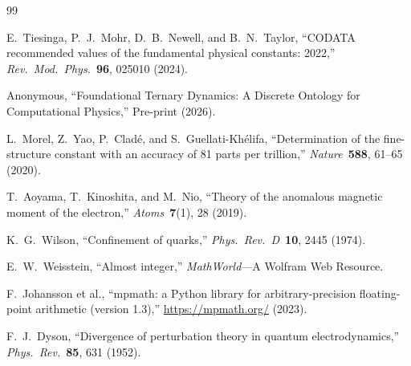 \documentclass[11pt,twoside]{article}
\theoremstyle{remark}
\begin{document}
\begin{thebibliography}{99}

E.~Tiesinga, P.~J.~Mohr, D.~B.~Newell, and B.~N.~Taylor,
``CODATA recommended values of the fundamental physical constants: 2022,''
\textit{Rev.\ Mod.\ Phys.}\ \textbf{96}, 025010 (2024).

Anonymous,
``Foundational Ternary Dynamics: A Discrete Ontology for Computational Physics,''
Pre-print (2026).

L.~Morel, Z.~Yao, P.~Clad\'{e}, and S.~Guellati-Kh\'{e}lifa,
``Determination of the fine-structure constant with an accuracy of 81 parts per trillion,''
\textit{Nature}\ \textbf{588}, 61--65 (2020).

T.~Aoyama, T.~Kinoshita, and M.~Nio,
``Theory of the anomalous magnetic moment of the electron,''
\textit{Atoms}\ \textbf{7}(1), 28 (2019).

K.~G.~Wilson,
``Confinement of quarks,''
\textit{Phys.\ Rev.\ D}\ \textbf{10}, 2445 (1974).

E.~W.~Weisstein,
``Almost integer,''
\textit{MathWorld}---A Wolfram Web Resource.

F.~Johansson et al.,
``mpmath: a Python library for arbitrary-precision floating-point arithmetic (version 1.3),''
\url{https://mpmath.org/} (2023).

F.~J.~Dyson,
``Divergence of perturbation theory in quantum electrodynamics,''
\textit{Phys.\ Rev.}\ \textbf{85}, 631 (1952).

\end{thebibliography}
\end{document}

